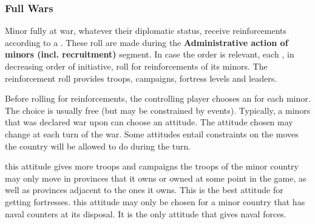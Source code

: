 \subsubsection{Full Wars}
\aparag[Generalities]
\bparag Minor fully at war, whatever their diplomatic status, receive
reinforcements according to a .
\bparag These roll are made during the \textbf{Administrative action of minors
  (incl. recruitment)} segment.
\bparag In case the order is relevant, each \MAJ, in decreasing order of
initiative, roll for reinforcements of its minors.
\bparag The reinforcement roll provides troops, campaigns, fortress levels and
leaders.

\aparag[Attitude]
\bparag Before rolling for reinforcements, the controlling player chooses an
 for each minor.
\bparag The choice is usually free (but may be constrained by
events). Typically, a minors that was declared war upon can choose an
 attitude.
\bparag The attitude chosen may change at each turn of the war.
\bparag Some attitudes entail constraints on the moves the country will be
allowed to do during the turn.

\bparag[Offensive:] this attitude gives more troops and campaigns
%
\bparag[Defensive:] the troops of the minor country may only move in
provinces that it owns or owned at some point in the game, as well as
provinces adjacent to the ones it owns. This is the best attitude for getting
fortresses.
\bparag[Naval:] this attitude may only be chosen for a minor country that has
naval counters at its disposal. It is the only attitude that gives naval
forces.
%



